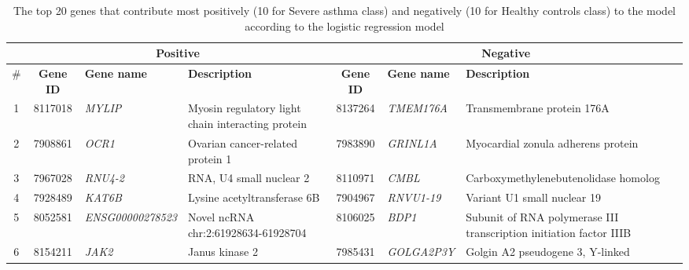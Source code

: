 \begin{table}[htbp] \centering
  \caption{The top 20 genes that contribute most positively (10 for Severe asthma class) and negatively (10 for Healthy controls class) to the model according to the logistic regression model}
  \label{tab:4-gene-logistic-importance}
  \begin{tabular}{cclp{4cm}clp{4cm}}
    \hline
       & \multicolumn{3}{c}{\textbf{Positive}} & \multicolumn{3}{c|}{\textbf{Negative}}                                                                                                                                                                   \\
    \hline
    \# & \textbf{Gene ID}                       & \textbf{Gene name}                     & \textbf{Description}                              & \textbf{Gene ID} & \textbf{Gene name} & \textbf{Description}                                                \\
    \hline
    1  & 8117018                                & \textit{MYLIP}                         & Myosin regulatory light chain interacting protein & 8137264          & \textit{TMEM176A}  & Transmembrane protein 176A                                          \\
    2  & 7908861                                & \textit{OCR1}                          & Ovarian cancer-related protein 1                  & 7983890          & \textit{GRINL1A}   & Myocardial zonula adherens protein                                  \\
    3  & 7967028                                & \textit{RNU4-2}                        & RNA, U4 small nuclear 2                           & 8110971          & \textit{CMBL}      & Carboxymethylenebutenolidase homolog                                \\
    4  & 7928489                                & \textit{KAT6B}                         & Lysine acetyltransferase 6B                       & 7904967          & \textit{RNVU1-19}  & Variant U1 small nuclear 19                                         \\
    5  & 8052581                                & \textit{ENSG00000278523}               & Novel ncRNA chr:2:61928634-61928704               & 8106025          & \textit{BDP1}      & Subunit of RNA polymerase III transcription initiation factor IIIB  \\
    6  & 8154211                                & \textit{JAK2}                          & Janus kinase 2                                    & 7985431          & \textit{GOLGA2P3Y} & Golgin A2 pseudogene 3, Y-linked                                    \\

\end{tabular}
\end{table}
